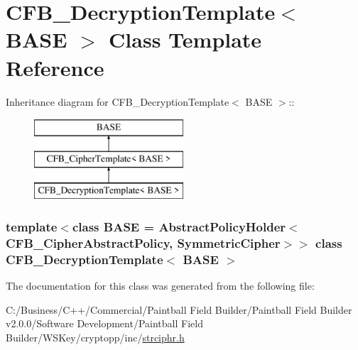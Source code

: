 \hypertarget{class_c_f_b___decryption_template}{
\section{CFB\_\-DecryptionTemplate$<$ BASE $>$ Class Template Reference}
\label{class_c_f_b___decryption_template}
}
Inheritance diagram for CFB\_\-DecryptionTemplate$<$ BASE $>$::\begin{figure}[H]
\begin{center}
\leavevmode
\includegraphics[height=3cm]{class_c_f_b___decryption_template}
\end{center}
\end{figure}
\subsubsection*{template$<$class BASE = AbstractPolicyHolder$<$CFB\_\-CipherAbstractPolicy, SymmetricCipher$>$$>$ class CFB\_\-DecryptionTemplate$<$ BASE $>$}



The documentation for this class was generated from the following file:\begin{DoxyCompactItemize}
\item 
C:/Business/C++/Commercial/Paintball Field Builder/Paintball Field Builder v2.0.0/Software Development/Paintball Field Builder/WSKey/cryptopp/inc/\hyperlink{strciphr_8h}{strciphr.h}\end{DoxyCompactItemize}
